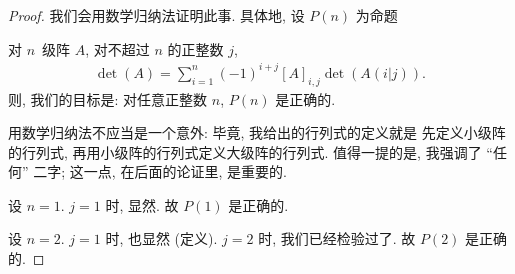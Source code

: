 \documentclass[%
    UTF8,%
    fontset=none,%
    punct=kaiming,%
    zihao=-4,%
    a4paper,%
    oneside,%
]{ctexbook}
\makeatletter
\let\emph\relax
\renewenvironment{quotation}
{\list{}{\listparindent 2\ccwd%
\itemindent\listparindent
\leftmargin\rightmargin
\parsep\z@ \@plus\p@}%
\item\relax}
{\endlist}
\makeatother
\begin{document}
\begin{proof}
    我们会用数学归纳法证明此事.
    具体地, 设 \(P(n)\) 为命题
    \begin{quotation}
        对\emph{任何} \(n\)~级阵 \(A\),
        对\emph{任何}不超过 \(n\) 的正整数 \(j\),
        \begin{align*}
            \det {(A)} = \sum_{i = 1}^{n}
            {(-1)^{i+j} [A]_{i,j} \det {(A(i|j))}}.
        \end{align*}
    \end{quotation}
    则, 我们的目标是:
    对任意正整数 \(n\), \(P(n)\) 是正确的.

    用数学归纳法不应当是一个意外:
    毕竟, 我给出的行列式的定义就是%
    先定义小级阵的行列式,
    再用小级阵的行列式定义大级阵的行列式.
    值得一提的是, 我强调了 ``任何'' 二字;
    这一点, 在后面的论证里, 是重要的.

    设 \(n = 1\).
    \(j = 1\) 时, 显然.
    故 \(P(1)\) 是正确的.

    设 \(n = 2\).
    \(j = 1\) 时, 也显然 (定义).
    \(j = 2\) 时, 我们已经检验过了.
    故 \(P(2)\) 是正确的.


\end{proof}
\end{document}
